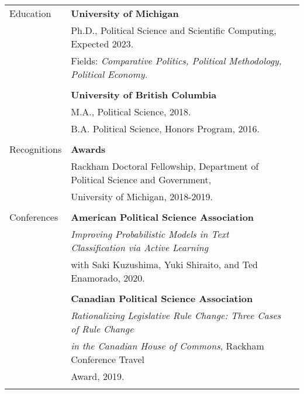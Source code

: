 \documentclass[letterpaper,11pt,oneside]{article}
\begin{document}
\bigskip
\noindent
\begin{tabular}{@{} l l l}
  \Large{Education}   & \textbf{University of Michigan} \\
                      & Ph.D., Political Science and Scientific Computing, Expected 2023. \\
                      & Fields: \textit{Comparative Politics, Political Methodology, Political
                        Economy.} \\
                      & \\
                      & \textbf{University of British Columbia} \\
                      & M.A., Political Science, 2018. \\
                      & B.A. Political Science, Honors Program, 2016. \\
                      & \\
  \Large{Recognitions}   & \textbf{Awards} \\
                      & Rackham Doctoral Fellowship, Department of Political Science and Government, \\
                      & University of Michigan, 2018-2019. \\
                      & \\

  \Large{Conferences} & \textbf{American Political Science Association} \\
                      & \textit{Improving Probabilistic Models in Text Classification via Active Learning} \\
                      & with Saki Kuzushima, Yuki Shiraito, and Ted Enamorado, 2020.\\
  \\
                      & \textbf{Canadian Political Science Association} \\
                      & \textit{Rationalizing Legislative Rule Change: Three Cases of Rule      Change} \\
                      & \textit{in the Canadian House of Commons}, Rackham Conference Travel \\
                      & Award, 2019. \\
  \\


\end{tabular}
\end{document}
